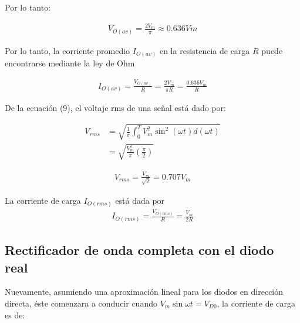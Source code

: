 \documentclass{article}
\begin{document}
Por lo tanto:

\begin{align}
	V_{O(av)} = \frac{2V_m}{\pi} \approx 0.636Vm
\end{align}

Por lo tanto, la corriente promedio $I_{O(av)}$ en la resistencia de carga $R$ puede encontrarse mediante la ley de Ohm

\begin{align}
	I_{O(av)} = \frac{V_{O(av)}}{R} = \frac{2V_m}{\pi R} = \frac{0.636V_m}{R}
\end{align}

De la ecuación (9), el voltaje rms de una señal está dado por:

\begin{align}
	V_{rms} &= \sqrt{\frac{1}{\pi} \int_{0}^{T} { V^2_m \sin^2                                                                                                                                                                                                                                                                                                                                                                                                                                                                                                                                                                                                                                                                                                                                                                                                                                                                                                                                                                                                                                       (\omega t) d(\omega t) }} \nonumber \\
	&= \sqrt{\frac{V^2_m}{\pi} \left(\frac{\pi}{2} \right)} \nonumber 
\end{align}

\begin{align}
	V_{rms} = \frac{V_m}{\sqrt{2}} = 0.707V_m
\end{align}

La corriente de carga $I_{O(rms)}$ está dada por
\begin{align}
	I_{O(rms)} = \frac{V_{O(rms)}}{R} = \frac{V_m}{2R}
\end{align}

\subsection*{Rectificador de onda completa con el diodo real}
Nuevamente, asumiendo una aproximación lineal para los diodos en dirección directa, éste comenzara a conducir cuando $V_m \sin \omega t = V_{D0}$, la corriente de carga es de:
\end{document}
